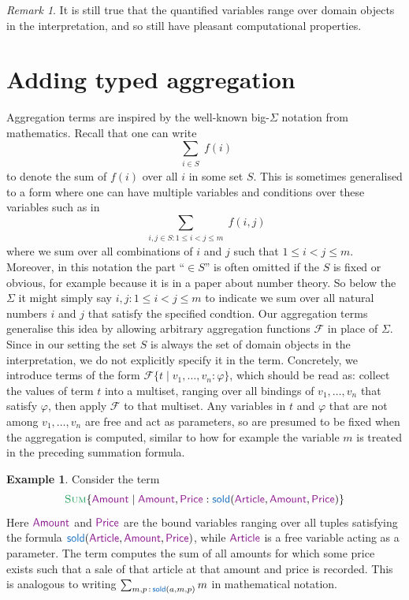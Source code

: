 \documentclass[11pt]{amsart}
\theoremstyle{definition}
\newtheorem{example}{Example}
\theoremstyle{remark}
\newtheorem{remark}[theorem]{Remark}
\newcommand{\pr}[1]{\mathsf{\textcolor{RoyalBlue}{#1}}}
\newcommand{\var}[1]{\mathsf{\textcolor{Plum}{#1}}}
\newcommand{\dataFun}[1]{\textcolor{ForestGreen}{\textsc{#1}}}
\begin{document}
\begin{remark}
It is still true that the quantified variables range over domain objects in the interpretation, and so still have pleasant computational properties. 
\end{remark}


\section{Adding typed aggregation}

Aggregation terms are inspired by the well-known big-$\Sigma$ notation from mathematics. Recall that one can write
$$\sum_{\substack{i \in S}} f(i)$$
to denote the sum of $f(i)$ over all $i$ in some set $S$. This is sometimes generalised to a form where one can have multiple variables and conditions over these variables such as in
$$\sum_{\substack{i, j \in S : 1 \leq i < j \leq m}} f(i, j)$$
where we sum over all combinations of $i$ and $j$ such that $1 \leq i < j \leq m$.
Moreover, in this notation the part ``$\in S$'' is often omitted if the $S$ is fixed or obvious, for example because it is in a paper about number theory. So below the $\Sigma$ it might simply say $i, j : 1 \leq i < j \leq m$ to  indicate we sum over all natural numbers $i$ and $j$ that satisfy the specified condtion.
Our aggregation terms generalise this idea by allowing arbitrary aggregation functions $\mathcal{F}$ in place of $\Sigma$. Since in our setting the set $S$ is always the set of domain objects in the interpretation, we do not explicitly specify it in the term.
Concretely, we introduce terms of the form $\mathcal{F}\{ t \mid v_1, \ldots, v_n : \varphi \}$, which should be read as: collect the values of term $t$ into a multiset, ranging over all bindings of $v_1, \ldots, v_n$ that satisfy $\varphi$, then apply $\mathcal{F}$ to that multiset. Any variables in $t$ and $\varphi$ that are not among $v_1, \ldots, v_n$ are free and act as parameters, so are presumed to be fixed when the aggregation is computed, similar to how for example the variable $m$ is treated in the preceding summation formula. 
\begin{example}
Consider the term
$$\dataFun{Sum}\{ \var{Amount} \mid \var{Amount}, \var{Price} : \pr{sold}(\var{Article}, \var{Amount}, \var{Price}) \}$$
Here $\var{Amount}$ and $\var{Price}$ are the bound variables ranging over all tuples satisfying the formula $\pr{sold}(\var{Article}, \var{Amount}, \var{Price})$, while $\var{Article}$ is a free variable acting as a parameter. The term computes the sum of all amounts for which some price exists such that a sale of that article at that amount and price is recorded. This is analogous to writing $\sum_{m, p\, :\, \pr{sold}(a, m, p)} m$ in mathematical notation.
\end{example}
\end{document}
